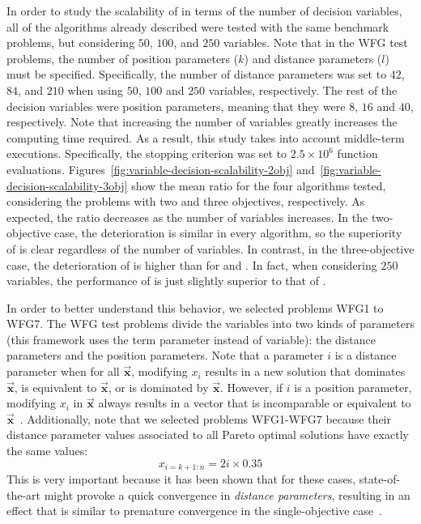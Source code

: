 In order to study the scalability of \VSDMOEA{} in terms of the number of decision variables, all of the algorithms already described were tested with
the same benchmark problems, but considering $50$, $100$, and $250$ variables.
%
Note that in the WFG test problems, the number of position parameters ($k$) and distance parameters ($l$) must be specified.
%
Specifically, the number of distance parameters was set to $42$, $84$, and $210$ when using $50$, $100$ and $250$ variables, respectively.
%
The rest of the decision variables were position parameters, meaning that they were $8$, $16$ and $40$, respectively.
%
Note that increasing the number of variables greatly increases the computing time required.
%
As a result, this study takes into account middle-term executions.
%
Specifically, the stopping criterion was set to $2.5 \times 10^6$ function evaluations.
%
Figures~\ref{fig:variable-decision-scalability-2obj} and~\ref{fig:variable-decision-scalability-3obj} 
show the mean \HV{} ratio for the four algorithms tested,
considering the problems with two and three objectives, respectively.
%
As expected, the \HV{} ratio decreases as the number of variables increases.
%
In the two-objective case, the deterioration is similar in every algorithm, so the superiority of \VSDMOEA{} is clear regardless of the number of 
variables.
%
In contrast, in the three-objective case, the deterioration of \VSDMOEA{} is higher than for \RMOEA{} and \MOEAD{}.
%
In fact, when considering $250$ variables, the performance of \VSDMOEA{} is just slightly superior to that of \RMOEA{}.


In order to better understand this behavior, we selected problems WFG1 to WFG7.
%
The WFG test problems divide the variables into two kinds of parameters (this framework uses the term parameter instead of 
variable): the distance parameters and the position parameters.
%
Note that a parameter $i$ is a distance parameter when for all $\vec{\mathbf{x}}$, modifying $x_i$ results in a new solution 
that dominates $\vec{\mathbf{x}}$, is equivalent to $\vec{\mathbf{x}}$, or is dominated by $\vec{\mathbf{x}}$.
%
However, if $i$ is a position parameter, modifying $x_i$ in $\vec{\mathbf{x}}$ always results in a vector that is incomparable or 
equivalent to $\vec{\mathbf{x}}$~\cite{huband2005scalable}.
%
Additionally, note that we selected problems WFG1-WFG7 because their distance parameter values associated to all Pareto optimal solutions 
have exactly the same values:
%
\begin{equation}
   x_{i=k+1:n} = 2i \times 0.35
\end{equation}
%
This is very important because it has been shown that for these cases, state-of-the-art
\MOEAS{} might provoke a quick convergence in \textit{distance parameters}, resulting in an effect that is similar to premature convergence
in the single-objective case~\cite{Joel:GDE3_CEC09}.


